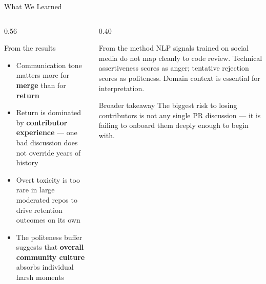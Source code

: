 \documentclass[aspectratio=169,11pt]{beamer}
\begin{document}
\begin{frame}{What We Learned}
\begin{columns}[T]
\begin{column}{0.56\textwidth}
\begin{block}{From the results}
\begin{itemize}
  \item Communication tone matters more for \textbf{merge} than for \textbf{return}
  \item Return is dominated by \textbf{contributor experience} --- one bad discussion does not override years of history
  \item Overt toxicity is too rare in large moderated repos to drive retention outcomes on its own
  \item The politeness buffer suggests that \textbf{overall community culture} absorbs individual harsh moments
\end{itemize}
\end{block}
\end{column}

\begin{column}{0.40\textwidth}
\begin{alertblock}{From the method}
NLP signals trained on social media do not map cleanly to code review. Technical assertiveness scores as anger; tentative rejection scores as politeness. Domain context is essential for interpretation.
\end{alertblock}

\vspace{0.5em}
\begin{exampleblock}{Broader takeaway}
The biggest risk to losing contributors is not any single PR discussion --- it is failing to onboard them deeply enough to begin with.
\end{exampleblock}
\end{column}
\end{columns}
\end{frame}
\end{document}
